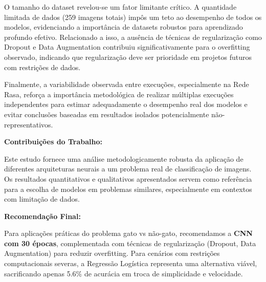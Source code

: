 \documentclass[a4paper,12pt]{article}
\begin{document}
O tamanho do dataset revelou-se um fator limitante crítico. A quantidade limitada de dados (259 imagens totais) impôs um teto ao desempenho de todos os modelos, evidenciando a importância de datasets robustos para aprendizado profundo efetivo. Relacionado a isso, a ausência de técnicas de regularização como Dropout e Data Augmentation contribuiu significativamente para o overfitting observado, indicando que regularização deve ser prioridade em projetos futuros com restrições de dados.

Finalmente, a variabilidade observada entre execuções, especialmente na Rede Rasa, reforça a importância metodológica de realizar múltiplas execuções independentes para estimar adequadamente o desempenho real dos modelos e evitar conclusões baseadas em resultados isolados potencialmente não-representativos.

\textbf{Contribuições do Trabalho:}

Este estudo fornece uma análise metodologicamente robusta da aplicação de diferentes arquiteturas neurais a um problema real de classificação de imagens. Os resultados quantitativos e qualitativos apresentados servem como referência para a escolha de modelos em problemas similares, especialmente em contextos com limitação de dados.

\textbf{Recomendação Final:}

Para aplicações práticas do problema gato vs não-gato, recomendamos a \textbf{CNN com 30 épocas}, complementada com técnicas de regularização (Dropout, Data Augmentation) para reduzir overfitting. Para cenários com restrições computacionais severas, a Regressão Logística representa uma alternativa viável, sacrificando apenas 5.6\% de acurácia em troca de simplicidade e velocidade.

\appendix




\end{document}
